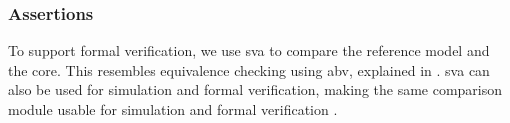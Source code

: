 %
%
%
%
%


\subsubsection{Assertions}

To support formal verification, we use \acrfull{sva} to compare the reference model and the core. This resembles equivalence checking using \acrfull{abv}, explained in . \acrshort{sva} can also be used for simulation and formal verification, making the same comparison module usable for simulation and formal verification \cite{cernySVAPowerAssertions2015}. 


